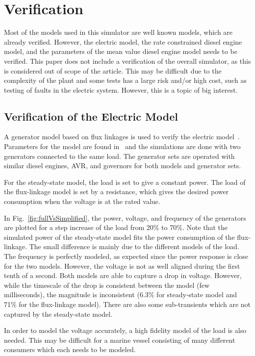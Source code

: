 \documentclass[journal]{IEEEtran}
\begin{document}
\section{Verification}
Most of the models used in this simulator are well known models, which are already verified.
However, the electric model, the rate constrained diesel engine model, and the parameters of the mean value diesel engine model needs to be verified.
This paper does not include a verification of the overall simulator, as this is considered out of scope of the article.
This may be difficult due to the complexity of the plant and some tests has a large risk and/or high cost, such as testing of faults in the electric system.
However, this is a topic of big interest.

\subsection{Verification of the Electric Model}
\label{sec:elverification}
A generator model based on flux linkages is used to verify the electric model~\cite[Ch.~5.11]{Krause2013}.
Parameters for the model are found in~\cite[Tab.~5.10-1]{Krause2013} and the simulations are done with two generators connected to the same load.
The generator sets are operated with similar diesel engines, AVR, and governors for both models and generator sets.

For the steady-state model, the load is set to give a constant power.
The load of the flux-linkage model is set by a resistance, which gives the desired power consumption when the voltage is at the rated value.

In Fig.~\ref{fig:fullVsSimplified}, the power, voltage, and frequency of the generators are plotted for a step increase of the load from 20\% to 70\%.
Note that the simulated power of the steady-state model fits the power consumption of the flux-linkage. The small difference is mainly due to the different models of the load.
The frequency is perfectly modeled, as expected since the power response is close for the two models.
However, the voltage is not as well aligned during the first tenth of a second.
Both models are able to capture a drop in voltage.
However, while the timescale of the drop is consistent between the model (few milliseconds), the magnitude is inconsistent (6.3\% for steady-state model and 71\% for the flux-linkage model).
There are also some sub-transients which are not captured by the steady-state model.

In order to model the voltage accurately, a high fidelity model of the load is also needed.
This may be difficult for a marine vessel consisting of many different consumers which each needs to be modeled.
\end{document}
